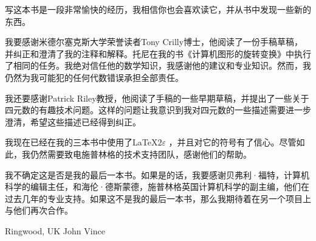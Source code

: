 写这本书是一段非常愉快的经历，我相信你也会喜欢读它，并从书中发现一些新的东西。

我要感谢米德尔塞克斯大学荣誉读者Tony Crilly博士，他阅读了一份手稿草稿，并纠正和澄清了我的注释和解释。托尼在我的书《计算机图形的旋转变换》中执行了相同的任务。我绝对信任他的数学知识，我感谢他的建议和专业知识。然而，我仍然为我可能犯的任何代数错误承担全部责任。

我还要感谢Patrick Riley教授，他阅读了手稿的一些早期草稿，并提出了一些关于四元数的有趣技术问题。这样的问题让我意识到我对四元数的一些描述需要进一步澄清，希望这些描述已经得到纠正。

我现在已经在我的三本书中使用了\LaTeX$ 2\varepsilon$ ，并且对它的符号有了信心。尽管如此，我仍然需要致电施普林格的技术支持团队，感谢他们的帮助。

我不确定这是否是我的最后一本书。如果是的话，我要感谢贝弗利·福特，计算机科学的编辑主任，和海伦·德斯蒙德，施普林格英国计算机科学的副主编，他们在过去几年的专业支持。如果这不是我的最后一本书，那么我期待着在另一个项目上与他们再次合作。


Ringwood, UK  \hfill                                               John Vince
